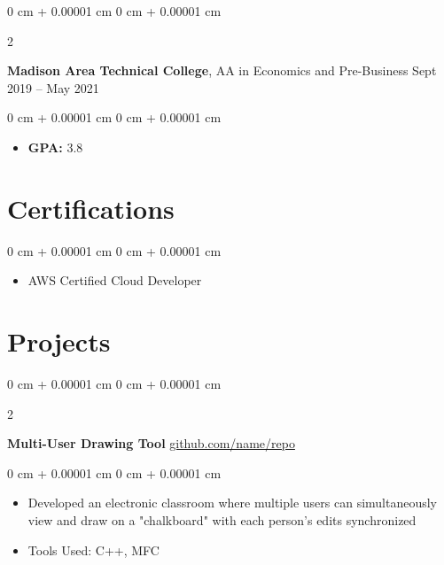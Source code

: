 \documentclass[10pt, letterpaper]{article}
\newenvironment{highlights}{
    \begin{itemize}[
        topsep=0.10 cm,
        parsep=0.10 cm,
        partopsep=0pt,
        itemsep=0pt,
        leftmargin=0 cm + 10pt
    ]
}{
    \end{itemize}
} %
\newenvironment{onecolentry}{
    \begin{adjustwidth}{
        0 cm + 0.00001 cm
    }{
        0 cm + 0.00001 cm
    }
}{
    \end{adjustwidth}
} %
\newenvironment{twocolentry}[2][]{
    \onecolentry
    \def\secondColumn{#2}
    \setcolumnwidth{\fill, 4.5 cm}
    \begin{paracol}{2}
}{
    \switchcolumn \raggedleft \secondColumn
    \end{paracol}
    \endonecolentry
} %
\begin{document}
        \vspace{0.2 cm}

        \begin{twocolentry}{
            Sept 2019 – May 2021
        }
            \textbf{Madison Area Technical College}, AA in Economics and Pre-Business\end{twocolentry}

        \vspace{0.10 cm}
        \begin{onecolentry}
            \begin{highlights}
                \item \textbf{GPA:} 3.8
            \end{highlights}
        \end{onecolentry}

    
    \section{Certifications}



        
        \begin{samepage}
            \begin{onecolentry}
                \begin{highlights}
                    \item AWS Certified Cloud Developer
                \end{highlights}
            \end{onecolentry}

            
        \end{samepage}


    
    \section{Projects}



        
        \begin{twocolentry}{
            \href{https://github.com/sinaatalay/rendercv}{github.com/name/repo}
        }
            \textbf{Multi-User Drawing Tool}\end{twocolentry}

        \vspace{0.10 cm}
        \begin{onecolentry}
            \begin{highlights}
                \item Developed an electronic classroom where multiple users can simultaneously view and draw on a "chalkboard" with each person's edits synchronized
                \item Tools Used: C++, MFC
            \end{highlights}
        \end{onecolentry}
\end{document}
